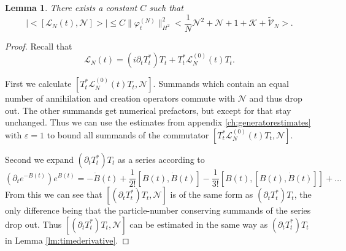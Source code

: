 \documentclass[11pt,a4paper,DIV11]{scrartcl}	%
\newtheorem{lem}[thm]{Lemma}
\newcommand{\Lcal}{\mathcal{L}}		%
\newcommand{\Ncal}{\mathcal{N}}		%
\newcommand{\Kcal}{\mathcal{K}}		%
\newcommand{\tilV}{\tilde{\mathcal{V}}_N}		%
\newcommand{\hc}{\mbox{h.c.}}		%
\newcommand{\norm}[1]{\lVert#1\rVert}	%
\newcommand{\ev}[1]{\big<#1\big>}	%
\newcommand{\ph}{\varphi_t^{(N)}}	%
\newcommand{\bd}{\begin{displaymath}}			%
\newcommand{\ed}{\end{displaymath}}
\begin{document}
\begin{lem}
\label{lem:lncommutatorbound}
There exists a constant $C$ such that
 \bd
  \lvert \ev{[\Lcal_N(t),\Ncal]} \rvert \leq C \norm{\ph}_{H^2}^2 \ev{\frac{1}{N}\Ncal^2 + \Ncal + 1 + \Kcal + \tilV}.
 \ed
\end{lem}
\begin{proof}
Recall that
\[\Lcal_N(t) = (i \partial_t T^\ast_t)T_t + T^\ast_t \Lcal_N^{(0)}(t)T_t.\]

First we calculate $[T^\ast_t \Lcal_N^{(0)}(t)T_t,\Ncal]$. Summands which contain an equal number of annihilation and creation operators commute with $\Ncal$ and thus drop out. The other summands get numerical prefactors, but except for that stay unchanged. %
Thus we can use the estimates from appendix \ref{ch:generatorestimates}
with $\varepsilon = 1$ to bound all summands of the commutator $[T^\ast_t \Lcal_N^{(0)}(t)T_t,\Ncal]$.

Second we expand $(\partial_t T^\ast_t)T_t$ as a series according to
\bd
\left(\partial_t e^{-B(t)} \right) e^{B(t)} = - \dot B(t) +
\frac{1}{2!}[B(t),\dot B(t)] - \frac{1}{3!}[B(t),[B(t),\dot B(t)]] + \dots
\ed
From this we can see that $[(\partial_t T^\ast_t)T_t,\Ncal]$ is of the same form as $(\partial_t T^\ast_t)T_t$, the only difference being that the particle-number conserving summands of the series drop out. Thus  $[(\partial_t T^\ast_t)T_t,\Ncal]$ can be estimated in the same way as $(\partial_t T^\ast_t)T_t$ in Lemma \ref{lm:timederivative}.
\end{proof}
\end{document}
